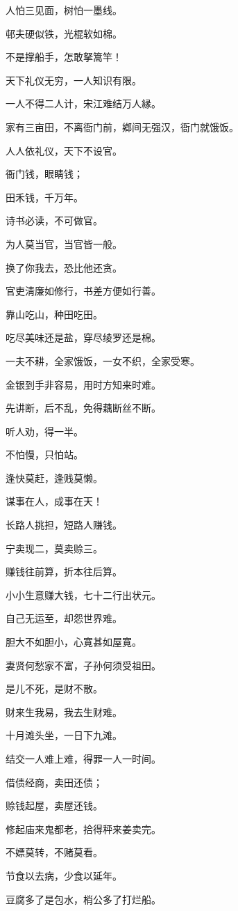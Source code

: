 \documentclass[12pt,oneside]{book}
\begin{document}
人怕三见面，树怕一墨线。

邨夫硬似铁，光棍软如棉。

不是撑船手，怎敢拏篙竿！

天下礼仪无穷，一人知识有限。

一人不得二人计，宋江难结万人縁。

家有三亩田，不离衙门前，鄕间无强汉，衙门就饿饭。

人人依礼仪，天下不设官。

衙门钱，眼睛钱；

田禾钱，千万年。

诗书必读，不可做官。

为人莫当官，当官皆一般。

换了你我去，恐比他还贪。

官吏淸廉如修行，书差方便如行善。

靠山吃山，种田吃田。

吃尽美味还是盐，穿尽绫罗还是棉。

一夫不耕，全家饿饭，一女不织，全家受寒。

金银到手非容易，用时方知来时难。

先讲断，后不乱，免得藕断丝不断。

听人劝，得一半。

不怕慢，只怕站。

逢快莫赶，逢贱莫懒。

谋事在人，成事在天！

长路人挑担，短路人赚钱。

宁卖现二，莫卖赊三。

赚钱往前算，折本往后算。

小小生意赚大钱，七十二行出状元。

自己无运至，却怨世界难。

胆大不如胆小，心寛甚如屋寛。

妻贤何愁家不富，子孙何须受祖田。

是儿不死，是财不散。

财来生我易，我去生财难。

十月滩头坐，一日下九滩。

结交一人难上难，得罪一人一时间。

借债经商，卖田还债；

赊钱起屋，卖屋还钱。

修起庙来鬼都老，拾得秤来姜卖完。

不嫖莫转，不赌莫看。

节食以去病，少食以延年。

豆腐多了是包水，梢公多了打烂船。
\end{document}
